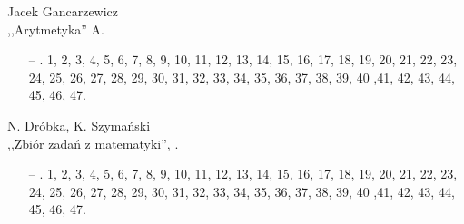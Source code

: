 \documentclass[a4paper,11pt]{article}
\newcommand{\cm}{\checkmark}
\begin{document}
\begin{center}
Jacek Gancarzewicz\\
,,Arytmetyka'' A.
\end{center}
\begin{itemize}
\item[--]. 1, 2, 3, 4, 5, 6, 7, 8, 9, 10, 11, 12, 13, 14, 15, 16, 17, 18, 19, 20, 21, 22, 23, 24, 25, 26, 27, 28, 29, 30, 31, 32, 33, 34, 35, 36, 37, 38, 39, 40 ,41, 42, 43, 44, 45, 46, 47.
\end{itemize}



\begin{center}
N. Dróbka, K. Szymański\\
,,Zbiór zadań z matematyki'', \cite{NDKSzZZM}.
\end{center}
\begin{itemize}
\item[--]. 1\cm , 2, 3, 4, 5, 6, 7, 8, 9, 10, 11, 12, 13, 14, 15, 16, 17, 18, 19, 20, 21, 22, 23, 24, 25, 26, 27, 28, 29, 30, 31, 32, 33, 34, 35, 36, 37, 38, 39, 40 ,41, 42, 43, 44, 45, 46, 47.
\end{itemize}
\end{document}
